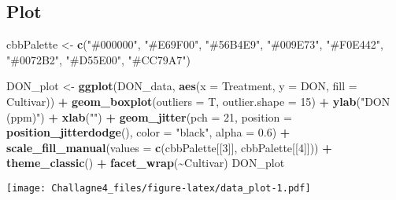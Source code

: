 \documentclass[
]{article}
\newenvironment{Shaded}{\begin{snugshade}}{\end{snugshade}}
\newcommand{\AttributeTok}[1]{\textcolor[rgb]{0.13,0.29,0.53}{#1}}
\newcommand{\DecValTok}[1]{\textcolor[rgb]{0.00,0.00,0.81}{#1}}
\newcommand{\FloatTok}[1]{\textcolor[rgb]{0.00,0.00,0.81}{#1}}
\newcommand{\FunctionTok}[1]{\textcolor[rgb]{0.13,0.29,0.53}{\textbf{#1}}}
\newcommand{\NormalTok}[1]{#1}
\newcommand{\OtherTok}[1]{\textcolor[rgb]{0.56,0.35,0.01}{#1}}
\newcommand{\SpecialCharTok}[1]{\textcolor[rgb]{0.81,0.36,0.00}{\textbf{#1}}}
\newcommand{\StringTok}[1]{\textcolor[rgb]{0.31,0.60,0.02}{#1}}
\begin{document}
\subsection{\texorpdfstring{\textbf{Plot}}{Plot}}\label{plot}

\begin{Shaded}
\begin{Highlighting}[]
\NormalTok{cbbPalette }\OtherTok{\textless{}{-}} \FunctionTok{c}\NormalTok{(}\StringTok{"\#000000"}\NormalTok{, }\StringTok{"\#E69F00"}\NormalTok{, }\StringTok{"\#56B4E9"}\NormalTok{, }\StringTok{"\#009E73"}\NormalTok{, }\StringTok{"\#F0E442"}\NormalTok{, }\StringTok{"\#0072B2"}\NormalTok{, }\StringTok{"\#D55E00"}\NormalTok{, }\StringTok{"\#CC79A7"}\NormalTok{)}


\NormalTok{DON\_plot }\OtherTok{\textless{}{-}} \FunctionTok{ggplot}\NormalTok{(DON\_data, }\FunctionTok{aes}\NormalTok{(}\AttributeTok{x =}\NormalTok{ Treatment, }\AttributeTok{y =}\NormalTok{ DON, }\AttributeTok{fill =}\NormalTok{ Cultivar)) }\SpecialCharTok{+}
  \FunctionTok{geom\_boxplot}\NormalTok{(}\AttributeTok{outliers =}\NormalTok{ T, }\AttributeTok{outlier.shape =} \DecValTok{15}\NormalTok{) }\SpecialCharTok{+}
  \FunctionTok{ylab}\NormalTok{(}\StringTok{"DON (ppm)"}\NormalTok{) }\SpecialCharTok{+}
  \FunctionTok{xlab}\NormalTok{(}\StringTok{""}\NormalTok{) }\SpecialCharTok{+}
  \FunctionTok{geom\_jitter}\NormalTok{(}\AttributeTok{pch =} \DecValTok{21}\NormalTok{, }\AttributeTok{position =} \FunctionTok{position\_jitterdodge}\NormalTok{(), }\AttributeTok{color =} \StringTok{"black"}\NormalTok{, }\AttributeTok{alpha =} \FloatTok{0.6}\NormalTok{) }\SpecialCharTok{+} 
  \FunctionTok{scale\_fill\_manual}\NormalTok{(}\AttributeTok{values =} \FunctionTok{c}\NormalTok{(cbbPalette[[}\DecValTok{3}\NormalTok{]], cbbPalette[[}\DecValTok{4}\NormalTok{]])) }\SpecialCharTok{+}
  \FunctionTok{theme\_classic}\NormalTok{() }\SpecialCharTok{+}
  \FunctionTok{facet\_wrap}\NormalTok{(}\SpecialCharTok{\textasciitilde{}}\NormalTok{Cultivar)}
\NormalTok{DON\_plot}
\end{Highlighting}
\end{Shaded}

\texttt{[image: Challagne4\_files/figure-latex/data\_plot-1.pdf]}
\end{document}

